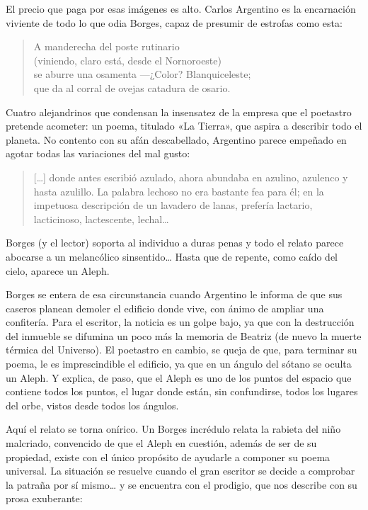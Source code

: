 \documentclass[11pt,a4paper]{article}
\begin{document}
El precio que paga por esas imágenes es alto. Carlos Argentino es la encarnación viviente de todo lo que odia Borges, capaz de presumir de estrofas como esta:

\begin{verse}
A manderecha del poste rutinario \\
(viniendo, claro está, desde el Nornoroeste) \\
se aburre una osamenta ---¿Color? Blanquiceleste; \\
que da al corral de ovejas catadura de osario.
\end{verse}

Cuatro alejandrinos que condensan la insensatez de la empresa que el poetastro pretende acometer: un poema, titulado «La Tierra», que aspira a describir todo el planeta. No contento con su afán descabellado, Argentino parece empeñado en agotar todas las variaciones del mal gusto:

\begin{quotation}
[…] donde antes escribió azulado, ahora abundaba en azulino, azulenco y hasta azulillo. La palabra lechoso no era bastante fea para él; en la impetuosa descripción de un lavadero de lanas, prefería lactario, lacticinoso, lactescente, lechal…
\end{quotation}

Borges (y el lector) soporta al individuo a duras penas y todo el relato parece abocarse a un melancólico sinsentido… Hasta que de repente, como caído del cielo, aparece un Aleph.

Borges se entera de esa circunstancia cuando Argentino le informa de que sus caseros planean demoler el edificio donde vive, con ánimo de ampliar una confitería. Para el escritor, la noticia es un golpe bajo, ya que con la destrucción del inmueble se difumina un poco más la memoria de Beatriz (de nuevo la muerte térmica del Universo). El poetastro en cambio, se queja de que, para terminar su poema, le es imprescindible el edificio, ya que en un ángulo del sótano se oculta un Aleph. Y explica, de paso, que el Aleph es uno de los puntos del espacio que contiene todos los puntos, el lugar donde están, sin confundirse, todos los lugares del orbe, vistos desde todos los ángulos.

Aquí el relato se torna onírico. Un Borges incrédulo relata la rabieta del niño malcriado, convencido de que el Aleph en cuestión, además de ser de su propiedad, existe con el único propósito de ayudarle a componer su poema universal. La situación se resuelve cuando el gran escritor se decide a comprobar la patraña por sí mismo… y se encuentra con el prodigio, que nos describe con su prosa exuberante:
\end{document}
